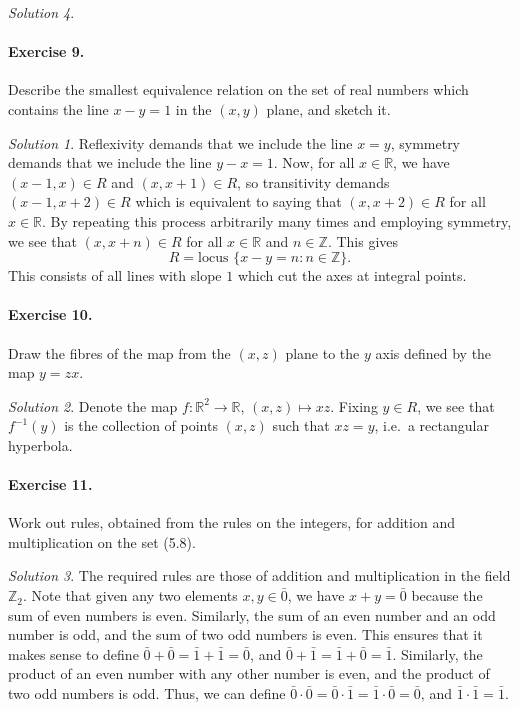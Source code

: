 \documentclass[11pt]{report}
\def\R{\mathbb{R}}
\def\Z{\mathbb{Z}}
\theoremstyle{remark}
\newtheorem*{solution}{Solution}
\begin{document}
\begin{solution}
    \paragraph{Exercise 9.} Describe the smallest equivalence relation on the set of
    real numbers which contains the line $x - y = 1$ in the $(x, y)$ plane, and
    sketch it.
    \begin{solution}
        Reflexivity demands that we include the line $x = y$, symmetry demands that
        we include the line $y - x = 1$. Now, for all $x \in \R$, we have $(x - 1,
        x) \in R$ and $(x, x + 1) \in R$, so transitivity demands $(x - 1, x + 2)
        \in R$ which is equivalent to saying that $(x, x + 2) \in R$ for all $x \in
        \R$. By repeating this process arbitrarily many times and employing
        symmetry, we see that $(x, x + n) \in R$ for all $x \in \R$ and $n \in \Z$.
        This gives \[
            R = \text{locus }\{x - y = n\colon n \in \Z\}.
        \] This consists of all lines with slope $1$ which cut the axes at integral
        points.
    \end{solution}

    \paragraph{Exercise 10.} Draw the fibres of the map from the $(x, z)$ plane to
    the $y$ axis defined by the map $y = zx$.
    \begin{solution}
        Denote the map $f\colon \R^2 \to \R$, $(x, z) \mapsto xz$. Fixing $y \in R$,
        we see that $f^{-1}(y)$ is the collection of points $(x, z)$ such that
        $xz = y$, i.e.\ a rectangular hyperbola.
    \end{solution}
    
    \paragraph{Exercise 11.} Work out rules, obtained from the rules on the
    integers, for addition and multiplication on the set (5.8).
    \begin{solution}
        The required rules are those of addition and multiplication in the field
        $\Z_2$. Note that given any two elements $x, y \in \bar{0}$, we have $x + y
        = \bar{0}$ because the sum of even numbers is even. Similarly, the sum of an
        even number and an odd number is odd, and the sum of two odd numbers is
        even. This ensures that it makes sense to define $\bar{0} + \bar{0} =
        \bar{1} + \bar{1} = \bar{0}$, and $\bar{0} + \bar{1} = \bar{1} + \bar{0} =
        \bar{1}$. Similarly, the product of an even number with any other number is
        even, and the product of two odd numbers is odd. Thus, we can define
        $\bar{0}\cdot \bar{0} = \bar{0} \cdot \bar{1} = \bar{1} \cdot \bar{0} =
        \bar{0}$, and $\bar{1} \cdot \bar{1} = \bar{1}$.
    \end{solution}
    

\end{solution}
\end{document}
